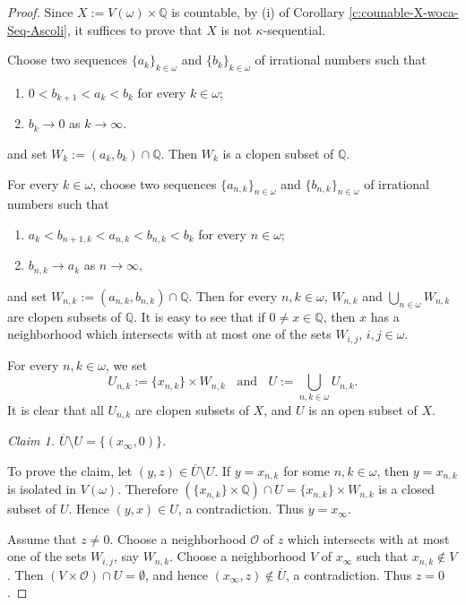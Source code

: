 \documentclass[10pt,a4paper]{amsart}
\newcommand{\SM}{{\setminus}}
\newcommand{\w}{\omega}
\begin{document}
\begin{proof}
Since $X:=V(\w)\times \mathbb{Q}$ is countable, by (i) of Corollary \ref{c:counable-X-woca-Seq-Ascoli}, it suffices to prove that $X$ is not $\kappa$-sequential.

Choose two sequences $\{a_k\}_{k\in\w}$ and  $\{b_k\}_{k\in\w}$ of irrational numbers such that
\begin{enumerate}
\item[(a)] $0<b_{k+1}<a_k<b_k$ for every $k\in\w$;
\item[(b)] $b_k\to 0$ as $k\to\infty$.
\end{enumerate}
and set  $W_k:=(a_k,b_k)\cap \mathbb{Q}$. Then $W_k$ is a clopen subset of $\mathbb{Q}$.

For every $k\in\w$, choose two sequences $\{a_{n,k}\}_{n\in\w}$ and  $\{b_{n,k}\}_{n\in\w}$ of irrational numbers such that
\begin{enumerate}
\item[(c)] $a_k<b_{n+1,k}<a_{n,k}<b_{n,k}< b_k$ for every $n\in\w$;
\item[(d)] $b_{n,k}\to a_k$ as $n\to\infty$,
\end{enumerate}
and set $W_{n,k}:=(a_{n,k},b_{n,k})\cap \mathbb{Q}$. Then for every $n,k\in\w$, $W_{n,k}$ and $\bigcup_{n\in\w} W_{n,k}$ are clopen subsets of $\mathbb{Q}$. It is easy to see that if $0\not=x\in\mathbb{Q}$, then $x$ has a neighborhood which intersects with at most one of the sets $W_{i,j}$, $i,j\in\w$.

For every $n,k\in\w$, we set
\[
U_{n,k}:=\{x_{n,k}\}\times W_{n,k} \;\; \mbox{ and }\;\;  U:=\bigcup_{n,k\in\w} U_{n,k}.
\]
It is clear that all $U_{n,k}$ are clopen subsets of $X$, and $U$ is an open subset of $X$.
\smallskip

{\em Claim 1. $\overline{U}\SM U=\{(x_\infty,0)\}$.}
\smallskip

To prove the claim, let $(y,z)\in \overline{U}\SM U$. If $y=x_{n,k}$ for some $n,k\in\w$, then $y=x_{n,k}$ is isolated in $V(\w)$. Therefore $(\{x_{n,k}\}\times \mathbb{Q})\cap U= \{x_{n,k}\}\times W_{n,k}$ is a closed subset of $U$. Hence $(y,x)\in U$, a contradiction. Thus $y=x_\infty$.

Assume that $z\not= 0$. Choose a neighborhood $\mathcal{O}$ of $z$ which intersects with at most one of the sets $W_{i,j}$, say  $W_{n,k}$. Choose a neighborhood $V$ of $x_\infty$ such that $x_{n,k}\not\in V$. Then $(V\times \mathcal{O})\cap U=\emptyset$, and hence $(x_\infty,z)\not\in \overline{U}$, a contradiction. Thus $z=0$.


\end{proof}
\end{document}
